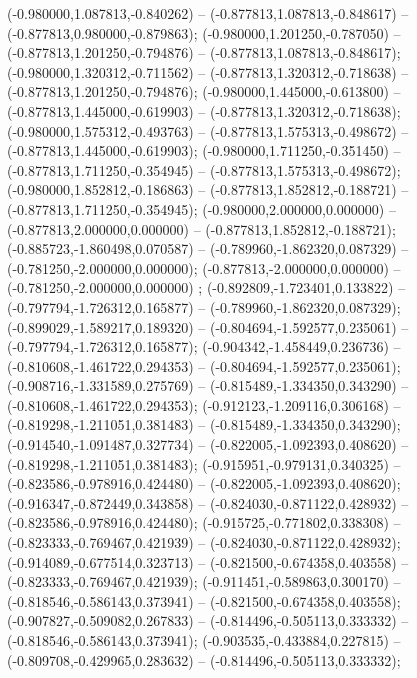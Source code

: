  (-0.980000,1.087813,-0.840262) -- (-0.877813,1.087813,-0.848617) -- (-0.877813,0.980000,-0.879863);
 (-0.980000,1.201250,-0.787050) -- (-0.877813,1.201250,-0.794876) -- (-0.877813,1.087813,-0.848617);
 (-0.980000,1.320312,-0.711562) -- (-0.877813,1.320312,-0.718638) -- (-0.877813,1.201250,-0.794876);
 (-0.980000,1.445000,-0.613800) -- (-0.877813,1.445000,-0.619903) -- (-0.877813,1.320312,-0.718638);
 (-0.980000,1.575312,-0.493763) -- (-0.877813,1.575313,-0.498672) -- (-0.877813,1.445000,-0.619903);
 (-0.980000,1.711250,-0.351450) -- (-0.877813,1.711250,-0.354945) -- (-0.877813,1.575313,-0.498672);
 (-0.980000,1.852812,-0.186863) -- (-0.877813,1.852812,-0.188721) -- (-0.877813,1.711250,-0.354945);
 (-0.980000,2.000000,0.000000) -- (-0.877813,2.000000,0.000000) -- (-0.877813,1.852812,-0.188721);
 (-0.885723,-1.860498,0.070587) -- (-0.789960,-1.862320,0.087329) -- (-0.781250,-2.000000,0.000000);
 (-0.877813,-2.000000,0.000000) -- (-0.781250,-2.000000,0.000000) ;
 (-0.892809,-1.723401,0.133822) -- (-0.797794,-1.726312,0.165877) -- (-0.789960,-1.862320,0.087329);
 (-0.899029,-1.589217,0.189320) -- (-0.804694,-1.592577,0.235061) -- (-0.797794,-1.726312,0.165877);
 (-0.904342,-1.458449,0.236736) -- (-0.810608,-1.461722,0.294353) -- (-0.804694,-1.592577,0.235061);
 (-0.908716,-1.331589,0.275769) -- (-0.815489,-1.334350,0.343290) -- (-0.810608,-1.461722,0.294353);
 (-0.912123,-1.209116,0.306168) -- (-0.819298,-1.211051,0.381483) -- (-0.815489,-1.334350,0.343290);
 (-0.914540,-1.091487,0.327734) -- (-0.822005,-1.092393,0.408620) -- (-0.819298,-1.211051,0.381483);
 (-0.915951,-0.979131,0.340325) -- (-0.823586,-0.978916,0.424480) -- (-0.822005,-1.092393,0.408620);
 (-0.916347,-0.872449,0.343858) -- (-0.824030,-0.871122,0.428932) -- (-0.823586,-0.978916,0.424480);
 (-0.915725,-0.771802,0.338308) -- (-0.823333,-0.769467,0.421939) -- (-0.824030,-0.871122,0.428932);
 (-0.914089,-0.677514,0.323713) -- (-0.821500,-0.674358,0.403558) -- (-0.823333,-0.769467,0.421939);
 (-0.911451,-0.589863,0.300170) -- (-0.818546,-0.586143,0.373941) -- (-0.821500,-0.674358,0.403558);
 (-0.907827,-0.509082,0.267833) -- (-0.814496,-0.505113,0.333332) -- (-0.818546,-0.586143,0.373941);
 (-0.903535,-0.433884,0.227815) -- (-0.809708,-0.429965,0.283632) -- (-0.814496,-0.505113,0.333332);
